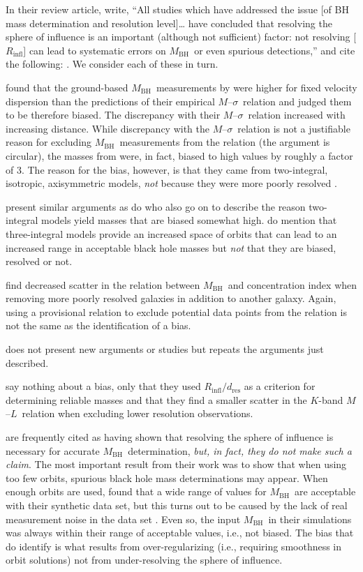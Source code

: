 \documentclass[twosided,letterpaper,numberedappendix]{emulateapj}
\newcommand{\msigma}   {\ensuremath{M}{--}\ensuremath{\sigma}}
\newcommand{\ml}       {\ensuremath{M}{--}\ensuremath{L}}
\newcommand{\mbh}      {\ensuremath{M_{\mathrm{BH}}}}
\newcommand{\rinfres} {\ensuremath{R_{\mathrm{infl}} / d_{\mathrm{res}}}}
\begin{document}
In their review article, \citet{ff05} write, ``All studies which have
addressed the issue [of BH mass determination and resolution level]\dots
have concluded that resolving the sphere of influence is an
important (although not sufficient) factor: not resolving
[$R_\mathrm{infl}$] can lead to systematic errors on \mbh\ or even
spurious detections,'' and cite the following: \cite{fm00, mf01a,
mf01b, grahametal01, ferrarese02, mh03}.  We consider each of
these in turn.

\citet{fm00} found that the ground-based \mbh\ measurements by
\citet{magorrianetal98} were higher for fixed velocity dispersion than
the predictions of their empirical \msigma\ relation and judged them
to be therefore biased.  The discrepancy with their \msigma\ relation
increased with increasing distance.  While discrepancy with the
\msigma\ relation is not a justifiable reason for excluding \mbh\
measurements from the relation (the argument is circular), the masses
from \citet{magorrianetal98} were, in fact, biased to high values by
roughly a factor of 3.  The reason for the bias, however, is that they
came from two-integral, isotropic, axisymmetric models, \emph{not}
because they were more poorly resolved \citep{mf01b,2003ApJ...583...92G}.

\citet{mf01a} present similar arguments as do \citet{mf01b} who also
go on to describe the reason two-integral models yield masses that are
biased somewhat high.  \citet{mf01b} do mention that three-integral
models provide an increased space of orbits that can lead to an
increased range in acceptable black hole masses but \emph{not} that
they are biased, resolved or not.

\citet{grahametal01} find decreased scatter in the relation between
\mbh\ and concentration index when removing more poorly resolved
galaxies in addition to another galaxy.  Again, using a provisional
relation to exclude potential data points from the relation is not the
same as the identification of a bias.

\citet{ferrarese02} does not present new arguments or studies but
repeats the arguments just described.

\citet{mh03} say nothing about a bias, only that they used $\rinfres$
as a criterion for determining reliable masses and that they find a
smaller scatter in the $K$-band \ml\ relation when excluding lower
resolution observations.

\citet{vme04} are frequently cited as having shown that resolving the
sphere of influence is necessary for accurate \mbh\ determination,
\emph{but, in fact, they do not make such a claim}.  The most
important result from their work was to show that when using too few
orbits, spurious black hole mass determinations may appear.  When
enough orbits are used, \citet{vme04} found that a wide range of
values for \mbh\ are acceptable with their synthetic data set, but
this turns out to be caused by the lack of real measurement noise in
the data set \citep{magorrian06}.  Even so, the input \mbh\ in their
simulations was always within their range of acceptable values, i.e.,
not biased.  The bias that \citet{vme04} do identify is what results
from over-regularizing (i.e., requiring smoothness in orbit solutions)
not from under-resolving the sphere of influence.
\end{document}
